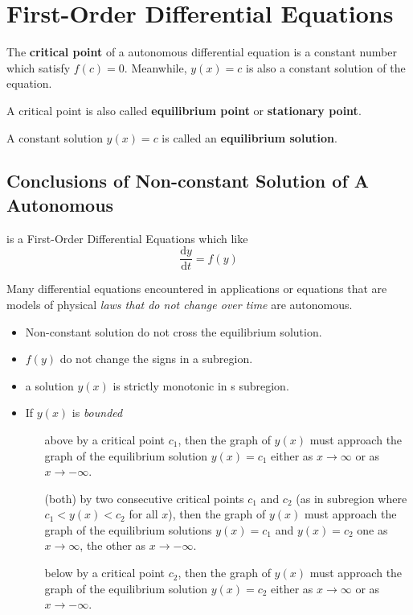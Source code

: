 \section{First-Order Differential Equations}

The \textbf{critical point} of a autonomous differential equation
is a constant number which satisfy $f(c) = 0$.
Meanwhile, $y(x) = c$ is also a constant solution of the equation.

A critical point is also called \textbf{equilibrium point} or
\textbf{stationary point}.

A constant solution $y(x) = c$ is called an 
\textbf{equilibrium solution}\cite{fcde}.

\subsection{Conclusions of Non-constant Solution of A Autonomous}

\begin{definition}
     is a First-Order Differential Equations which like
    \[
        \dfrac{\mathrm{d}y}{\mathrm{d}t} = f(y)
    \]

    Many differential equations encountered in applications or equations that are
    models of physical \emph{laws that do not change over time} are autonomous\cite{fcde}.
\end{definition}

\begin{itemize}
    \item Non-constant solution do not cross the equilibrium solution.
    \item $f(y)$ do not change the signs in a subregion.
    \item a solution $y(x)$ is strictly monotonic in s subregion.
    \item If $y(x)$ is \emph{bounded}
        \begin{itemize}
            \item[above] by a critical point $c_1$,
                then the graph of $y(x)$ must approach the graph of the
                equilibrium solution $y(x) = c_1$ 
                either as $x \to \infty$ or as $x \to - \infty$.
            \item[(both)] by two consecutive critical points 
                $c_1$ and $c_2$ (as in subregion where $c_1 < y(x) < c_2$ for all $x$),
                then the graph of $y(x)$ must approach the graph of the
                equilibrium solutions $y(x) = c_1$ and $y(x) = c_2$
                one as $x \to \infty$, the other as $x \to - \infty$.
            \item[below] by a critical point $c_2$,
                then the graph of $y(x)$ must approach the graph of the
                equilibrium solution $y(x) = c_2$ 
                either as $x \to \infty$ or as $x \to - \infty$.
        \end{itemize}
\end{itemize}

